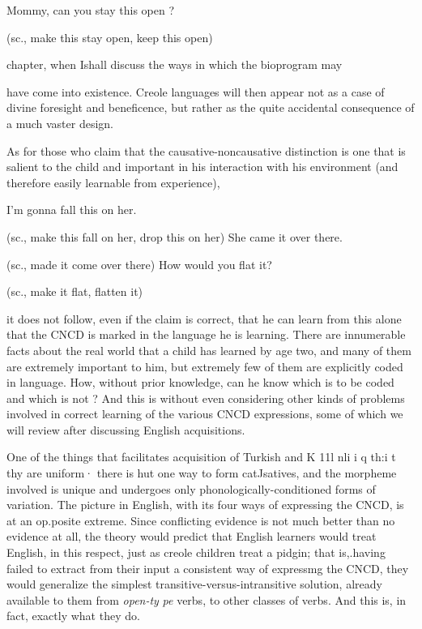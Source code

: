 \ea\label{ex:77}
Mommy, can you stay this open ?
\glt
\z

(sc., make this stay open, keep this open)

chapter, when Ishall discuss the ways in which the bioprogram may

have come into existence. Creole languages will then appear not as a case of divine foresight and beneficence, but rather as the quite acci\-dental consequence of a much vaster design.

As for those who claim that the causative-noncausative distinc\-tion is one that is salient to the child and important in his interaction with his environment (and therefore easily learnable from experience),

\ea\label{ex:78}

\glt
\z

\ea\label{ex:79}

\glt
\z

\ea\label{ex:80}

\glt
\z

I'm gonna fall this on her.

(sc., make this fall on her, drop this on her) She came it over there.

(sc., made it come over there) How would you flat it?

(sc., make it flat, flatten it)

it does not follow, even if the claim is correct, that he can learn from this alone that the CNCD is marked in the language he is learning. There are innumerable facts about the real world that a child has learned by age two, and many of them are extremely important to him, but extremely few of them are explicitly coded in language. How, without prior knowledge, can he know which is to be coded and which is not ? And this is without even considering other kinds of problems involved in correct learning of the various CNCD expressions, some of which we will review after discussing English acquisitions.

One of the things that facilitates acquisition of Turkish and K 11l nli i q th:i t th{\textquotedbl}y are uniform· there is hut one way to form catJsatives, and the morpheme involved is unique and undergoes only phonologically-conditioned forms of variation. The picture in English, with its four ways of expressing the CNCD, is at an op.posite extreme. Since conflicting evidence is not much better than no evidence at all, the theory would predict that English learners would treat En\-glish, in this respect, just as creole children treat a pidgin; that is,.having failed to extract from their input a consistent way of expressmg the CNCD, they would generalize the simplest transitive-versus-intransitive solution, already available to them from \textit{open-}\textit{t}\textit{y} \textit{pe }verbs, to other classes of verbs. And this is, in fact, exactly what they do.

